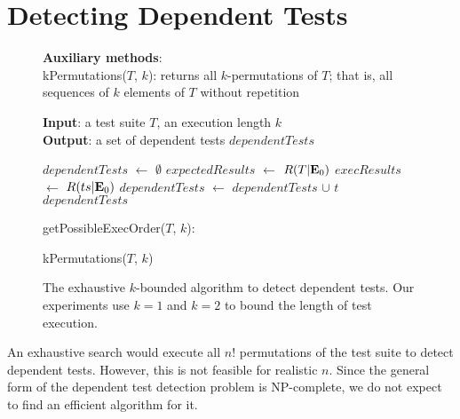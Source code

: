 \section{Detecting Dependent Tests}
\label{sec:detecting}

\newcommand{\testlist}[0]{\ensuremath{T^k_i}}
\newcommand{\executeTestsInOrder}[1]{\result{#1}{\env_0}}

\begin{figure}[t]
\textbf{Auxiliary methods}:\\
kPermutations($T$, $k$): returns all $k$-permutations of $T$; that is, all
sequences of $k$ elements of $T$ without repetition

\medskip

\textbf{Input}: a test suite $\mathit{T}$, an execution length $\mathit{k}$\\
\textbf{Output}: a set of dependent tests $\mathit{dependentTests}$\\
\vspace{-5mm}
\begin{algorithmic}[1]
\STATE $\mathit{dependentTests}$ $\leftarrow$ $\emptyset$
\STATE $\mathit{expectedResults}$ $\leftarrow$ $R(T|\mathbf{E}_0)$
\STATE $\mathit{execResults}$ $\leftarrow$ $R(ts|\mathbf{E}_0)$
\STATE $\mathit{dependentTests}$ $\leftarrow$ $\mathit{dependentTests}$ $\cup$ $\mathit{t}$
\ENDIF
\ENDFOR
\ENDFOR
\RETURN $\mathit{dependentTests}$
\end{algorithmic}


\medskip

getPossibleExecOrder($T$, $k$):\\
\vspace{-5mm}
\begin{algorithmic}[1]
\RETURN kPermutations($T$, $k$)
\end{algorithmic}

\vspace{-3mm}
\caption {The exhaustive $k$-bounded algorithm to detect dependent tests.
Our experiments use $k=1$ and $k=2$ to bound the length of
test execution. } 
\label{fig:dtalgorithm}
\end{figure}
An exhaustive search would execute all $n!$
permutations of the test suite to detect dependent tests.
However, this is not feasible for realistic $n$.
Since the general form of the dependent test detection problem is
NP-complete, we do not expect to find an efficient algorithm for it.

